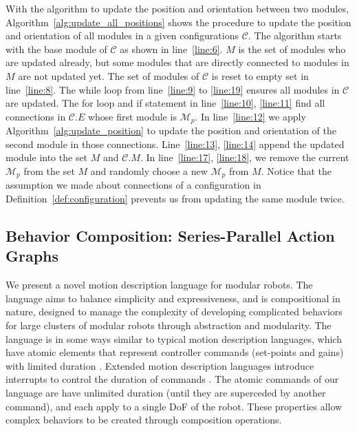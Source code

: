 \documentclass[conference]{IEEEtran}
\theoremstyle{definition}
\begin{document}
With the algorithm to update the position and orientation between two modules, Algorithm~\ref{alg:update_all_positions} shows the procedure to update the position and orientation of all modules in a given configurations $\mathcal{C}$. The algorithm starts with the base module of $\mathcal{C}$ as shown in line~\ref{line:6}. $M$ is the set of modules who are updated already, but some modules that are directly connected to modules in $M$ are not updated yet. The set of modules of $\mathcal{C}$ is reset to empty set in line~\ref{line:8}. The while loop from line~\ref{line:9} to \ref{line:19} ensures all modules in $\mathcal{C}$ are updated. The for loop and if statement in line~\ref{line:10}, \ref{line:11} find all connections in $\mathcal{C}.E$ whose first module is $\mathcal{M}_p$. In line~\ref{line:12} we apply Algorithm~\ref{alg:update_position} to update the position and orientation of the second module in those connections. Line~\ref{line:13}, \ref{line:14} append the updated module into the set $M$ and $\mathcal{C}.M$. In line~\ref{line:17}, \ref{line:18}, we remove the current $\mathcal{M}_p$ from the set $M$ and randomly choose a new $\mathcal{M}_p$ from $M$. Notice that the assumption we made about connections of a configuration in Definition~\ref{def:configuration} prevents us from updating the same module twice.


\subsection{Behavior Composition: Series-Parallel Action Graphs}
\label{sec:behavior-representation}
We present a novel motion description language for modular robots.  The
language aims to balance simplicity and expressiveness, and is compositional in
nature, designed to manage the complexity of developing complicated behaviors
for large clusters of modular robots through abstraction and modularity. 
The language is in some ways similar to typical motion description languages, which have atomic elements that represent controller
commands (set-points and gains) with limited duration \cite{brockett1988computer}.
Extended motion description languages introduce interrupts to control the duration
of commands \cite{hristu2003motion}.  The atomic commands of our language are have unlimited
duration (until they are superceded by another command), and each apply to a single
DoF of the robot.  These properties allow complex behaviors to be created through composition
operations.
\end{document}
